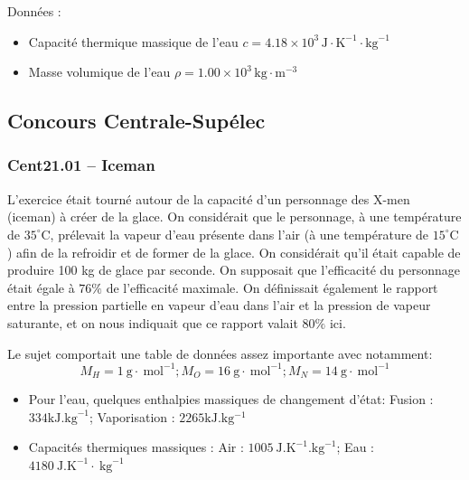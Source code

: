 Données :
\begin{itemize}
\item Capacité thermique massique de l'eau $c = 4.18 \times 10^{3}\,\text{J}\cdot\text{K}^{-1}\cdot\text{kg}^{-1}$
\item Masse volumique de l'eau $\rho = 1.00 \times 10^{3}\,\text{kg}\cdot\text{m}^{-3}$
\end{itemize}

\newpage
\subsection*{Concours Centrale-Supélec}

\subsubsection*{Cent21.01 -- Iceman  \corrige}

L'exercice était tourné autour de la capacité d'un personnage des X-men (iceman) à créer de la glace. On considérait que le personnage, à une température de $35^{\circ} \mathrm{C}$, prélevait la vapeur d'eau présente dans l'air (à une température de $15^{\circ} \mathrm{C}$ ) afin de la refroidir et de former de la glace. On considérait qu'il était capable de produire 100 kg de glace par seconde. On supposait que l'efficacité du personnage était égale à $76 \%$ de l'efficacité maximale. On définissait également le rapport entre la pression partielle en vapeur d'eau dans l'air et la pression de vapeur saturante, et on nous indiquait que ce rapport valait $80 \%$ ici.

\begin{center}
\end{center}

Le sujet comportait une table de données assez importante avec notamment:
$$
M_H=1 \mathrm{~g} \cdot \mathrm{~mol}^{-1} ; M_O=16 \mathrm{~g} \cdot \mathrm{~mol}^{-1} ; M_N=14 \mathrm{~g} \cdot \mathrm{~mol}^{-1}
$$

\begin{itemize}
\item Pour l'eau, quelques enthalpies massiques de changement d'état: Fusion : $334 \mathrm{kJ.kg}^{-1}$; Vaporisation : $2265 \mathrm{kJ.kg}{ }^{-1}$
\item Capacités thermiques massiques :  Air : $1005 \mathrm{~J} . \mathrm{K}^{-1} . \mathrm{kg}^{-1}$; Eau : $4180 \mathrm{~J} . \mathrm{K}^{-1} \cdot \mathrm{~kg}^{-1}$
\end{itemize}

